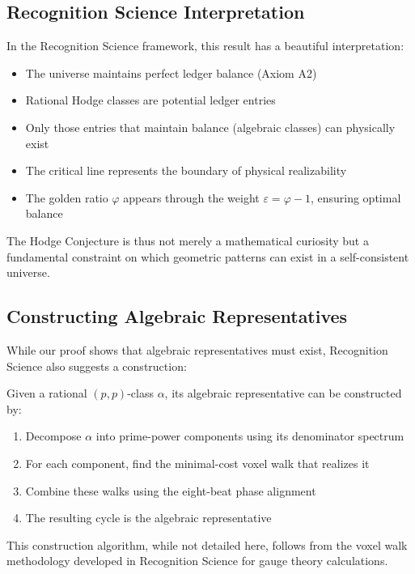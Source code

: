 \subsection{Recognition Science Interpretation}

In the Recognition Science framework, this result has a beautiful interpretation:

\begin{itemize}
\item The universe maintains perfect ledger balance (Axiom A2)
\item Rational Hodge classes are potential ledger entries
\item Only those entries that maintain balance (algebraic classes) can physically exist
\item The critical line represents the boundary of physical realizability
\item The golden ratio $\varphi$ appears through the weight $\varepsilon = \varphi - 1$, ensuring optimal balance
\end{itemize}

The Hodge Conjecture is thus not merely a mathematical curiosity but a fundamental constraint on which geometric patterns can exist in a self-consistent universe.

\subsection{Constructing Algebraic Representatives}

While our proof shows that algebraic representatives must exist, Recognition Science also suggests a construction:

\begin{proposition}
Given a rational $(p,p)$-class $\alpha$, its algebraic representative can be constructed by:
\begin{enumerate}
\item Decompose $\alpha$ into prime-power components using its denominator spectrum
\item For each component, find the minimal-cost voxel walk that realizes it
\item Combine these walks using the eight-beat phase alignment
\item The resulting cycle is the algebraic representative
\end{enumerate}
\end{proposition}

This construction algorithm, while not detailed here, follows from the voxel walk methodology developed in Recognition Science for gauge theory calculations.

